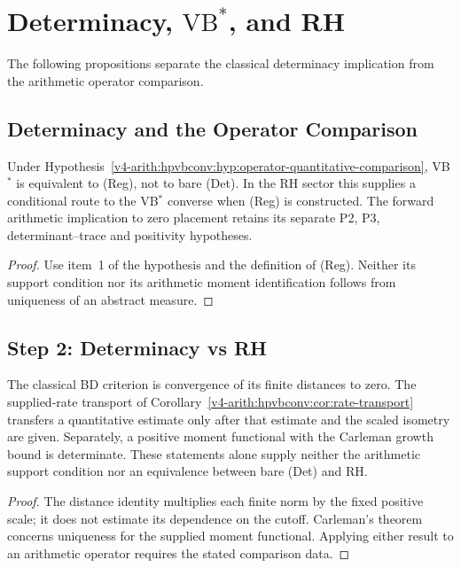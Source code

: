 \section{Determinacy, \(\mathrm{VB}^{*}\), and RH}
\label{v4-arith:r-comparison:chain-comparison}

The following propositions separate the classical determinacy implication
from the arithmetic operator comparison.

\subsection{Determinacy and the Operator Comparison}
\label{v4-arith:r-comparison:step-1}

\begin{proposition}
\label{v4-arith:r-comparison:prop:det-converse-not-main}
Under Hypothesis~\ref{v4-arith:hpvbconv:hyp:operator-quantitative-comparison},
VB\(^{*}\) is equivalent to (Reg), not to bare (Det).
In the RH sector this supplies a conditional route to the
VB\(^{*}\) converse when (Reg) is constructed. The forward
arithmetic implication to zero placement retains its separate
P2, P3, determinant--trace and positivity hypotheses.
\end{proposition}
\begin{proof}
Use item~1 of the hypothesis and the definition of (Reg).
Neither its support condition nor its arithmetic moment
identification follows from uniqueness of an abstract measure.
\end{proof}

\subsection{Step 2: Determinacy vs RH}
\label{v4-arith:r-comparison:step-2}

\begin{proposition}
\label{v4-arith:r-comparison:prop:det-strictly-finer}
The classical BD criterion is convergence of its finite distances
to zero. The supplied-rate transport of
Corollary~\ref{v4-arith:hpvbconv:cor:rate-transport} transfers a
quantitative estimate only after that estimate and the scaled
isometry are given. Separately, a positive moment functional with
the Carleman growth bound is determinate. These statements alone
supply neither the arithmetic support condition nor an equivalence
between bare (Det) and RH.
\end{proposition}
\begin{proof}
The distance identity multiplies each finite norm by the fixed
positive scale; it does not estimate its dependence on the cutoff.
Carleman's theorem concerns uniqueness for the supplied moment
functional. Applying either result to an arithmetic operator
requires the stated comparison data.
\end{proof}

